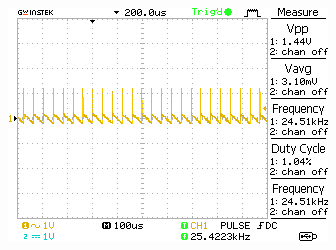 \documentclass[10pt]{article}
\newenvironment{Figure}
  {\par\medskip\noindent\minipage{\linewidth}}
  {\endminipage\par\medskip}
\begin{document}
\begin{multicols}{2}
\begin{Figure}
  \label{fig:mp}
\end{Figure}
\begin{Figure}
  \centering\includegraphics{../data/DS0011.png}
  \label{fig:kp}
\end{Figure}


\end{multicols}
\end{document}
